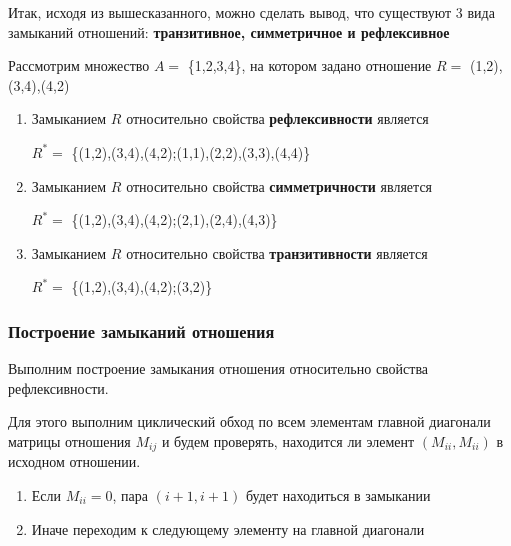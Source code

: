 \documentclass[bachelor, och, labwork]{shiza}
\begin{document}
Итак, исходя из вышесказанного, можно сделать вывод, что существуют 3 вида 
замыканий отношений: \textbf{транзитивное, симметричное и рефлексивное}

Рассмотрим множество $A=$ \{1,2,3,4\}, на котором задано отношение 
$R=$ {(1,2),(3,4),(4,2)} 

\begin{enumerate}

    \item Замыканием $R$ относительно свойства \textbf{рефлексивности} является     
        \begin{center}

            $R^*=$ \{(1,2),(3,4),(4,2);(1,1),(2,2),(3,3),(4,4)\} 
        
        \end{center}
  
    \item Замыканием $R$ относительно свойства \textbf{симметричности} является 
        \begin{center}
    
            $R^*=$ \{(1,2),(3,4),(4,2);(2,1),(2,4),(4,3)\} 
    
        \end{center}
  
    \item Замыканием $R$ относительно свойства \textbf{транзитивности} является 
        \begin{center}
        
            $R^*=$ \{(1,2),(3,4),(4,2);(3,2)\} 
        
        \end{center}
\end{enumerate}

\subsubsection{Построение замыканий отношения}

Выполним построение замыкания отношения относительно свойства 
рефлексивности.

Для этого выполним циклический обход по всем элементам главной диагонали 
матрицы отношения $M_{ij}$ и будем проверять, находится ли элемент 
$(M_{ii},M_{ii})$ в исходном отношении.

\begin{enumerate}
    
    \item Если $M_{ii} = 0$, пара $(i + 1, i + 1)$ будет находиться в замыкании    

    \item Иначе переходим к следующему элементу на главной диагонали

\end{enumerate}
\end{document}
